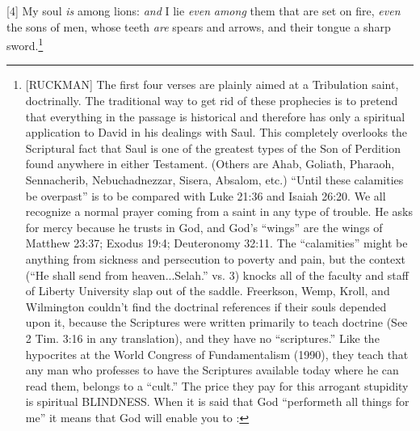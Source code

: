 [4] \textcolor[rgb]{0.00,0.00,1.00}{My soul \emph{is} among lions: \emph{and} I lie \emph{even} \emph{among} them that are set on fire, \emph{even} the sons of men, whose teeth \emph{are} spears and arrows, and their tongue a sharp sword.}\footnote{[RUCKMAN] The first four verses are plainly aimed at a Tribulation saint, doctrinally. The traditional way to get rid of these prophecies is to pretend that everything in the passage is historical and therefore has only a spiritual application to David in his dealings with Saul.  This completely overlooks the Scriptural fact that Saul is one of the greatest types of the Son of Perdition found anywhere in either Testament. (Others are Ahab, Goliath, Pharaoh, Sennacherib, Nebuchadnezzar, Sisera, Absalom, etc.) “Until these calamities be overpast” is to be compared with Luke 21:36 and Isaiah 26:20. We all recognize a normal prayer coming from a saint in any type of trouble. He asks for mercy because he trusts in God, and God’s “wings” are the wings of Matthew 23:37; Exodus 19:4; Deuteronomy 32:11. The “calamities” might be anything from sickness and persecution to poverty and pain, but the context (“He shall send from heaven...Selah.” vs. 3) knocks all of the faculty and staff of Liberty University slap out of the saddle. Freerkson, Wemp, Kroll, and Wilmington couldn’t find the doctrinal references if their souls depended upon it, because the Scriptures were written primarily to teach doctrine (See 2 Tim. 3:16 in any translation), and they have no “scriptures.” Like the hypocrites at the World Congress of Fundamentalism (1990), they teach that any man who professes to have the Scriptures available today where he can read them, belongs to a “cult.” The price they pay for this arrogant stupidity is spiritual BLINDNESS. When it is said that God “performeth all things for me” it means that God will enable you to  \cite{Ruckman1992Psalms} :
}
